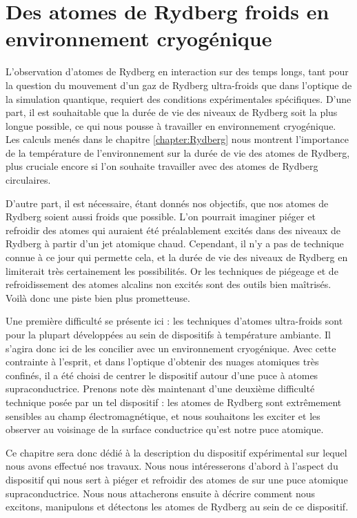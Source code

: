\chapter{Des atomes de Rydberg froids en environnement cryogénique}
\label{chapter:setup_coldatoms_Rydberg}
%

\noindent L'observation d'atomes de Rydberg en interaction sur des temps longs, tant pour la question du mouvement d'un gaz de Rydberg ultra-froids que dans l'optique de la simulation quantique, requiert des conditions expérimentales spécifiques.
D'une part, il est souhaitable que la durée de vie des niveaux de Rydberg soit la plus longue possible, ce qui nous pousse à travailler en environnement cryogénique.
Les calculs menés dans le chapitre \ref{chapter:Rydberg} nous montrent l'importance de la température de l'environnement sur la durée de vie des atomes de Rydberg, plus cruciale encore si l'on souhaite travailler avec des atomes de Rydberg circulaires.

D'autre part, il est nécessaire, étant donnés nos objectifs, que nos atomes de Rydberg soient aussi froids que possible.
L'on pourrait imaginer piéger et refroidir des atomes qui auraient été préalablement excités dans des niveaux de Rydberg à partir d'un jet atomique chaud.
Cependant, il n'y a pas de technique connue à ce jour qui permette cela, et la durée de vie des niveaux de Rydberg en limiterait très certainement les possibilités.
Or les techniques de piégeage et de refroidissement des atomes alcalins non excités sont des outils bien maîtrisés.
Voilà donc une piste bien plus prometteuse.

Une première difficulté se présente ici : les techniques d'atomes ultra-froids sont pour la plupart développées au sein de dispositifs à température ambiante.
Il s'agira donc ici de les concilier avec un environnement cryogénique.
Avec cette contrainte à l'esprit, et dans l'optique d'obtenir des nuages atomiques très confinés, il a été choisi de centrer le dispositif autour d'une puce à atomes supraconductrice.
Prenons note dès maintenant d'une deuxième difficulté technique posée par un tel dispositif :
les atomes de Rydberg sont extrêmement sensibles au champ électromagnétique, et nous souhaitons les exciter et les observer au voisinage de la surface conductrice qu'est notre puce atomique.

Ce chapitre sera donc dédié à la description du dispositif expérimental sur lequel nous avons effectué nos travaux.
Nous nous intéresserons d'abord à l'aspect du dispositif qui nous sert à piéger et refroidir des atomes de  sur une puce atomique supraconductrice.
Nous nous attacherons ensuite à décrire comment nous excitons, manipulons et détectons les atomes de Rydberg au sein de ce dispositif.

